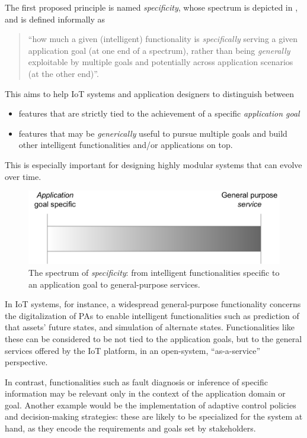 The first proposed principle is named \emph{specificity}, whose spectrum is depicted in , and is defined informally as 
\begin{quote}
    ``how much a given (intelligent) functionality is \emph{specifically} serving a given application goal (at one end of a spectrum), rather than being \emph{generally} exploitable by multiple goals and potentially across application scenarios (at the other end)''.
\end{quote}
%
This aims to help IoT systems and application designers to distinguish between
\begin{itemize}
    \item features that are strictly tied to the achievement of a specific \emph{application goal}
    \item features that may be \emph{generically} useful to pursue multiple goals and build other intelligent functionalities and/or applications on top.
\end{itemize}
%
This is especially important for designing highly modular systems that can evolve over time.

\begin{figure}
    \centering
    \includegraphics[width=.6\columnwidth]{figures/dt-mas/specificity-spectrum.pdf}
    \caption{The spectrum of \emph{specificity}: from intelligent functionalities specific to an application goal to general-purpose services.}
    \label{fig:specificity}
\end{figure}

In IoT systems, for instance, a widespread general-purpose functionality concerns the digitalization of \acp{PA} to enable intelligent functionalities such as prediction of that assets' future states, and simulation of alternate states. 
%
Functionalities like these can be considered to be not tied to the application goals, but to the general services offered by the IoT platform, in an open-system, ``as-a-service'' perspective.

In contrast, functionalities such as fault diagnosis or inference of specific information may be relevant only in the context of the application domain or goal. 
Another example would be the implementation of adaptive control policies and decision-making strategies: these are likely to be specialized for the system at hand, as they encode the requirements and goals set by stakeholders. 

